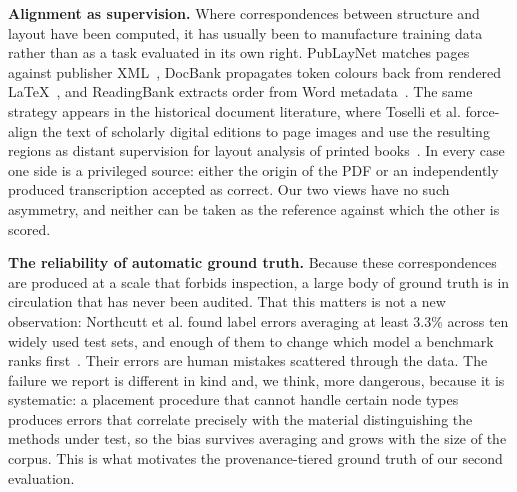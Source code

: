 \documentclass[11pt,twoside]{article}
\begin{document}
\textbf{Alignment as supervision.} Where correspondences between structure and layout have been computed, it has usually been to manufacture training data rather than as a task evaluated in its own right. PubLayNet matches pages against publisher XML~\cite{publaynet}, DocBank propagates token colours back from rendered \LaTeX{}~\cite{docbank}, and ReadingBank extracts order from Word metadata~\cite{layoutreader}. The same strategy appears in the historical document literature, where Toselli et al. force-align the text of scholarly digital editions to page images and use the resulting regions as distant supervision for layout analysis of printed books~\cite{toselli}. In every case one side is a privileged source: either the origin of the PDF or an independently produced transcription accepted as correct. Our two views have no such asymmetry, and neither can be taken as the reference against which the other is scored.

\textbf{The reliability of automatic ground truth.} Because these correspondences are produced at a scale that forbids inspection, a large body of ground truth is in circulation that has never been audited. That this matters is not a new observation: Northcutt et al. found label errors averaging at least 3.3\% across ten widely used test sets, and enough of them to change which model a benchmark ranks first~\cite{northcutt}. Their errors are human mistakes scattered through the data. The failure we report is different in kind and, we think, more dangerous, because it is systematic: a placement procedure that cannot handle certain node types produces errors that correlate precisely with the material distinguishing the methods under test, so the bias survives averaging and grows with the size of the corpus. This is what motivates the provenance-tiered ground truth of our second evaluation.
\end{document}
